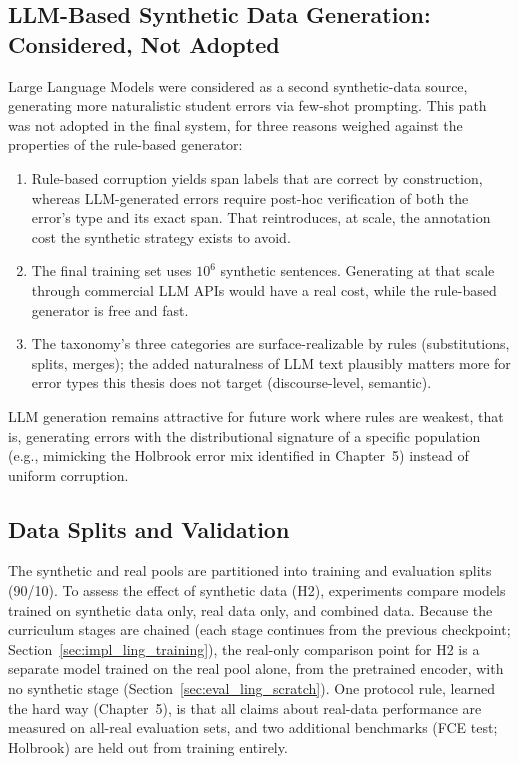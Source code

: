 \subsection{LLM-Based Synthetic Data Generation: Considered, Not Adopted}
\label{sec:method_data_llm}

Large Language Models were considered as a second synthetic-data source, generating more naturalistic student errors via few-shot prompting. This path was not adopted in the final system, for three reasons weighed against the properties of the rule-based generator:
\begin{enumerate}
    \item Rule-based corruption yields span labels that are correct by construction, whereas LLM-generated errors require post-hoc verification of both the error's type and its exact span. That reintroduces, at scale, the annotation cost the synthetic strategy exists to avoid.
    \item The final training set uses $10^6$ synthetic sentences. Generating at that scale through commercial LLM APIs would have a real cost, while the rule-based generator is free and fast.
    \item The taxonomy's three categories are surface-realizable by rules (substitutions, splits, merges); the added naturalness of LLM text plausibly matters more for error types this thesis does not target (discourse-level, semantic).
\end{enumerate}
LLM generation remains attractive for future work where rules are weakest, that is, generating errors with the distributional signature of a specific population (e.g., mimicking the Holbrook error mix identified in Chapter~5) instead of uniform corruption.

\subsection{Data Splits and Validation}
\label{sec:method_data_splits}

The synthetic and real pools are partitioned into training and evaluation splits (90/10). To assess the effect of synthetic data (H2), experiments compare models trained on synthetic data only, real data only, and combined data. Because the curriculum stages are chained (each stage continues from the previous checkpoint; Section~\ref{sec:impl_ling_training}), the real-only comparison point for H2 is a separate model trained on the real pool alone, from the pretrained encoder, with no synthetic stage (Section~\ref{sec:eval_ling_scratch}). One protocol rule, learned the hard way (Chapter~5), is that all claims about real-data performance are measured on all-real evaluation sets, and two additional benchmarks (FCE test; Holbrook) are held out from training entirely.

